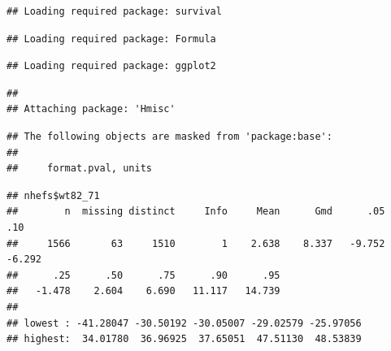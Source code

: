 \documentclass[
  10pt,
]{book}
\newenvironment{Shaded}{\begin{snugshade}}{\end{snugshade}}
\newcommand{\FunctionTok}[1]{\textcolor[rgb]{0.00,0.00,0.00}{#1}}
\newcommand{\NormalTok}[1]{#1}
\newcommand{\SpecialCharTok}[1]{\textcolor[rgb]{0.00,0.00,0.00}{#1}}
\begin{document}
\begin{verbatim}
## Loading required package: survival
\end{verbatim}

\begin{verbatim}
## Loading required package: Formula
\end{verbatim}

\begin{verbatim}
## Loading required package: ggplot2
\end{verbatim}

\begin{verbatim}
## 
## Attaching package: 'Hmisc'
\end{verbatim}

\begin{verbatim}
## The following objects are masked from 'package:base':
## 
##     format.pval, units
\end{verbatim}

\begin{Shaded}
\end{Shaded}

\begin{verbatim}
## nhefs$wt82_71 
##        n  missing distinct     Info     Mean      Gmd      .05      .10 
##     1566       63     1510        1    2.638    8.337   -9.752   -6.292 
##      .25      .50      .75      .90      .95 
##   -1.478    2.604    6.690   11.117   14.739 
## 
## lowest : -41.28047 -30.50192 -30.05007 -29.02579 -25.97056
## highest:  34.01780  36.96925  37.65051  47.51130  48.53839
\end{verbatim}
\end{document}

